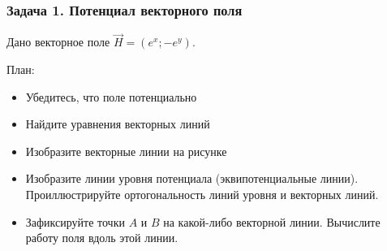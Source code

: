 \begin{frame}
\frametitle{Задача 1. Потенциал векторного поля}
Дано векторное поле $\vec H = \left( e^x; -e^y \right)$.

План:
\begin{itemize}
  \item Убедитесь, что поле потенциально
  \item Найдите уравнения векторных линий
  \item Изобразите векторные линии на рисунке
  \item Изобразите линии уровня потенциала (эквипотенциальные линии).
  Проиллюстрируйте ортогональность линий уровня и векторных линий.
  \item Зафиксируйте точки $A$ и $B$ на какой-либо векторной линии.
  Вычислите работу поля вдоль этой линии.
\end{itemize}
\end{frame}

